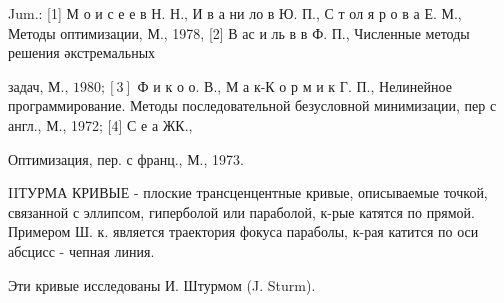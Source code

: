 \documentclass[10pt]{article}
\begin{document}
Jum.: [1] М о и с е е в Н. Н., И в а ни ло в Ю. П., С т ол я р о в а Е. М., Методы оптимизации, М., 1978, [2] В ас и ль в в Ф. П., Численные методы решения әкстремальных

задач, М., $1980 ;[3]$ Ф и к о о. В., М а к-К о р м и к Г. П., Нелинейное программирование. Методы последовательной безусловной минимизации, пер с англ., М., 1972; [4] С е а ЖК.,

Оптимизация, пер. с франц., М., 1973.



IIТУРМА КРИВЫЕ - плоские трансценцентные кривые, описываемые точкой, связанной с эллипсом, гиперболой или параболой, к-рые катятся по прямой. Примером Ш. к. является траектория фокуса параболы, к-рая катится по оси абсцисс - чепная линия.



Эти кривые исследованы И. Штурмом (J. Sturm).
\end{document}
